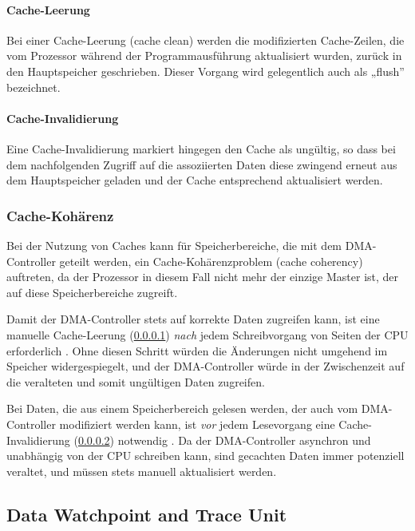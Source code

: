 \paragraph{Cache-Leerung} \label{sec:cache_clean}

Bei einer Cache-Leerung (cache clean) werden die modifizierten Cache-Zeilen, die
vom Prozessor während der Programmausführung aktualisiert wurden, zurück in den
Hauptspeicher geschrieben. Dieser Vorgang wird gelegentlich auch als „flush”
bezeichnet.

\paragraph{Cache-Invalidierung} \label{sec:cache_invalidate}

Eine Cache-Invalidierung markiert hingegen den Cache als ungültig, so dass bei
dem nachfolgenden Zugriff auf die assoziierten Daten diese zwingend erneut aus
dem Hauptspeicher geladen und der Cache entsprechend aktualisiert werden.

\subsubsection{Cache-Kohärenz} \label{sec:cache_coherency}

Bei der Nutzung von Caches kann für Speicherbereiche, die mit dem DMA-Controller
geteilt werden, ein Cache-Kohärenzproblem (cache coherency) auftreten, da der
Prozessor in diesem Fall nicht mehr der einzige Master ist, der auf diese
Speicherbereiche zugreift.

Damit der DMA-Controller stets auf korrekte Daten zugreifen kann, ist eine
manuelle Cache-Leerung (\ref{sec:cache_clean}) \textit{nach} jedem
Schreibvorgang von Seiten der CPU erforderlich \cite[S. 6]{an4839}. Ohne diesen
Schritt würden die Änderungen nicht umgehend im Speicher widergespiegelt, und
der DMA-Controller würde in der Zwischenzeit auf die veralteten und somit
ungültigen Daten zugreifen.

Bei Daten, die aus einem Speicherbereich gelesen werden, der auch vom
DMA-Controller modifiziert werden kann, ist \textit{vor} jedem Lesevorgang eine
Cache-Invalidierung (\ref{sec:cache_invalidate}) notwendig
\cite{embeddedexpert_cache}. Da der DMA-Controller asynchron und unabhängig von
der CPU schreiben kann, sind gecachten Daten immer potenziell veraltet, und
müssen stets manuell aktualisiert werden.

\subsection{Data Watchpoint and Trace Unit} \label{sec:dwt}

